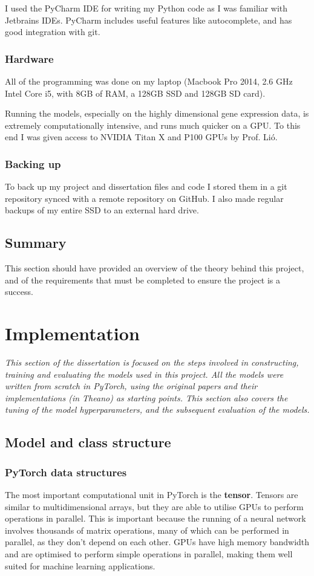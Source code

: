 \documentclass[12pt,a4paper,twoside,openright]{report}
\begin{document}
I used the PyCharm IDE for writing my Python code as I was familiar with Jetbrains IDEs.
PyCharm includes useful features like autocomplete, and has good integration with git.

\subsection{Hardware}
All of the programming was done on my laptop (Macbook Pro 2014, 2.6 GHz Intel Core i5, with 8GB of RAM, a 128GB SSD and 128GB SD card).

Running the models, especially on the highly dimensional gene expression data, is extremely computationally intensive, and runs much 
quicker on a GPU. To this end I was given access to NVIDIA Titan X and P100 GPUs by Prof. Li\'o.

\subsection{Backing up}
To back up my project and dissertation files and code I stored them in a git repository synced with a remote repository on GitHub. I also 
made regular backups of my entire SSD to an external hard drive.

\section{Summary}
This section should have provided an overview of the theory behind this project, and of the requirements that must be completed to 
ensure the project is a success.

\chapter{Implementation}

\textit{This section of the dissertation is focused on the steps involved in constructing, training and evaluating the models used in this project.
All the models were written from scratch in PyTorch, using the original papers and their implementations (in Theano) as starting points.
This section also covers the tuning of the model hyperparameters, and the subsequent evaluation of the models.}

\section{Model and class structure}

\subsection{PyTorch data structures}
The most important computational unit in PyTorch is the \textbf{tensor}. Tensors are similar to multidimensional arrays, but they are able to 
utilise GPUs to perform operations in parallel. This is important because the running of a neural network involves thousands of matrix 
operations, many of which can be performed in parallel, as they don't depend on each other. GPUs have high memory bandwidth and are 
optimised to perform simple operations in parallel, making them well suited for machine learning applications.
\end{document}
